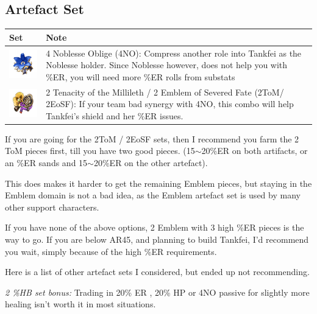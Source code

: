 \documentclass[11pt]{article}
\begin{document}
\subsection{Artefact Set}

\begin{tabular}{|m{}  | m{} | }
\hline Set & Note \\
\hline \includegraphics*[scale = 0.51]{4NoblesseOblige - Copy2.png} & 4 Noblesse Oblige (4NO): Compress another role into Tankfei as the Noblesse holder. Since Noblesse however, does not help you with \%ER, you will need more \%ER rolls from substats \\
\hline \includegraphics*[scale = 0.69]{2Ten2Emblem.png} & 2 Tenacity of the Millileth / 2 Emblem of Severed Fate (2ToM/ 2EoSF): If your team bad synergy with 4NO, this combo will help Tankfei's shield and her \%ER issues.\\
\hline 
\end{tabular}

If you are going for the 2ToM / 2EoSF sets, then I recommend you farm the 2 ToM pieces first, till you have two good pieces. (15$\sim$20\%ER on both artifacts, or an \%ER sands and 15$\sim$20\%ER on the other artefact). 

This does makes it harder to get the remaining Emblem pieces, but staying in the Emblem domain is not a bad idea, as the Emblem artefact set is used by many other support characters. 

If you have none of the above options, 2 Emblem with 3 high \%ER pieces is the way to go. If you are below AR45, and planning to build Tankfei, I'd recommend you wait, simply because of the high \%ER requirements.

Here is a list of other artefact sets I considered, but ended up not recommending.

\textit{2 \%HB set bonus:} Trading in 20\% ER , 20\% HP or 4NO passive for slightly more healing isn't worth it in most situations.  
\end{document}
